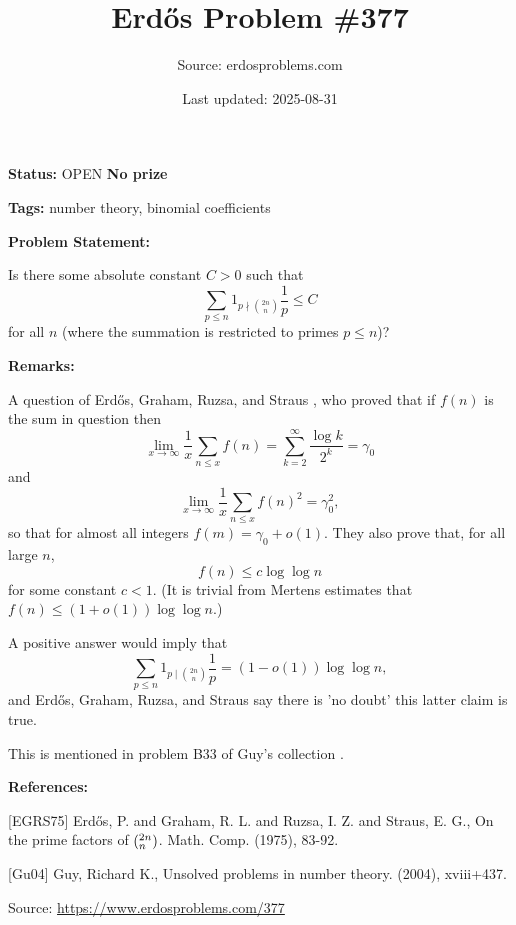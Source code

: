 \documentclass{article}
\title{Erd\H{o}s Problem \#377}
\date{Last updated: 2025-08-31}
\author{Source: erdosproblems.com}
\begin{document}
\maketitle

\noindent\textbf{Status:} OPEN \quad \textbf{No prize}

\noindent\textbf{Tags:} number theory, binomial coefficients

\medskip
\noindent\textbf{Problem Statement:}

Is there some absolute constant $C>0$ such that\[\sum_{p\leq n}1_{p\nmid \binom{2n}{n}}\frac{1}{p}\leq C\]for all $n$ (where the summation is restricted to primes $p\leq n$)?

\bigskip
\noindent\textbf{Remarks:}

A question of Erd\H{o}s, Graham, Ruzsa, and Straus \cite{EGRS75}, who proved that if $f(n)$ is the sum in question then\[\lim_{x\to \infty}\frac{1}{x}\sum_{n\leq x}f(n) = \sum_{k=2}^\infty \frac{\log k}{2^k}=\gamma_0\]and\[\lim_{x\to \infty}\frac{1}{x}\sum_{n\leq x}f(n)^2 = \gamma_0^2,\]so that for almost all integers $f(m)=\gamma_0+o(1)$. They also prove that, for all large $n$,\[f(n) \leq c\log\log n\]for some constant $c<1$. (It is trivial from Mertens estimates that $f(n)\leq (1+o(1))\log\log n$.)

A positive answer would imply that\[\sum_{p\leq n}1_{p\mid \binom{2n}{n}}\frac{1}{p}=(1-o(1))\log\log n,\]and Erd\H{o}s, Graham, Ruzsa, and Straus say there is 'no doubt' this latter claim is true.

This is mentioned in problem B33 of Guy's collection \cite{Gu04}.

\bigskip
\noindent\textbf{References:}

[EGRS75] Erd\H{o}s, P. and Graham, R. L. and Ruzsa, I. Z. and Straus, E. G., On the prime factors of $(\sp{2n}\sb{n})$. Math. Comp. (1975), 83-92.
 
 [Gu04] Guy, Richard K., Unsolved problems in number theory. (2004), xviii+437.

\bigskip
\noindent\small{Source: \url{https://www.erdosproblems.com/377}}
\end{document}
